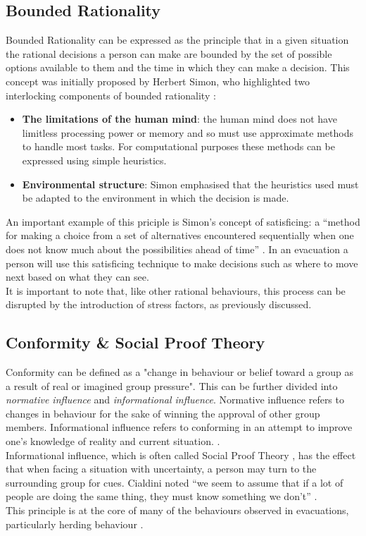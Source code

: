 \subsection{Bounded Rationality}
\label{Res:subsec:nonadaptive}
Bounded Rationality can be expressed as the principle that in a given situation the rational decisions a person can make are bounded by the set of possible options available to them and the time in which they can make a decision. This concept was initially proposed by Herbert Simon, who highlighted two interlocking components of bounded rationality \cite{BoundedRationalityDefinition}:
\begin{itemize}
  \item{\textbf{The limitations of the human mind}: the human mind does not have limitless processing power or memory and so must use approximate methods to handle most tasks. For computational purposes these methods can be expressed using simple heuristics.}
  \item{\textbf{Environmental structure}: Simon emphasised that the heuristics used must be adapted to the environment in which the decision is made.}
\end{itemize}
An important example of this priciple is Simon's concept of satisficing: a ``method for making a choice from a set of alternatives encountered sequentially when one does not know much about the possibilities ahead of time'' \cite{BoundedRationalityDefinition}. In an evacuation a person will use this satisficing technique to make decisions such as where to move next based on what they can see.\\
It is important to note that, like other rational behaviours, this process can be disrupted by the introduction of stress factors, as previously discussed.

\subsection{Conformity \& Social Proof Theory}
\label{Res:subsec:socialProof}
Conformity can be defined as a "change in behaviour or belief toward a group as a result of real or imagined group pressure". This can be further divided into \emph{normative influence} and \emph{informational influence}. Normative influence refers to changes in behaviour for the sake of winning the approval of other group members. Informational influence refers to conforming in an attempt to improve one's knowledge of reality and current situation. \cite{HandbookOfPsychology5}.\\
Informational influence, which is often called Social Proof Theory \cite{SocialProofWiki},  has the effect that when facing a situation with uncertainty, a person may turn to the surrounding group for cues. Cialdini noted ``we seem to assume that if a lot of people are doing the same thing, they must know something we don't'' \cite{PanMASSEgressThesis}.\\
This principle is at the core of many of the behaviours observed in evacuations, particularly herding behaviour \cite{PanMASSEgressThesis,MultiAgentFramework}.

